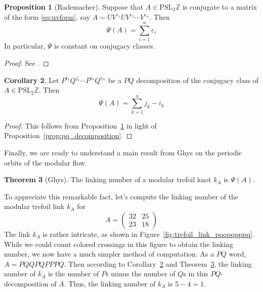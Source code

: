 \documentclass[12pt,twoside]{reedthesis}
\theoremstyle{definition}
\newtheorem{thm}{Theorem}[chapter]
\newtheorem{cor}[thm]{Corollary}
\newtheorem{prop}[thm]{Proposition}
\newcommand{\Z}{\mathbb{Z}}
\newcommand{\PSLZ}{\mathrm{PSL}_2{\Z}}
\begin{document}
\begin{prop}[Rademacher]\label{prop:rademacher_class_sum}
  Suppose that $A \in \PSLZ$ is conjugate to a matrix of the form \eqref{eq:uvform}, say $A \sim U V^{\varepsilon_1} U V^{\varepsilon_2} \cdots V^{\varepsilon_{n}}$.
  Then
  \begin{equation*}
    \Psi(A) = \sum_{i=1}^n \varepsilon_i
  \end{equation*}
  In particular, $\Psi$ is constant on conjugacy classes.
\end{prop}

\begin{proof}
  See \cite[58-60]{rademacher1972}.
\end{proof}

\begin{cor}\label{cor:rademacher_class_function_pq}
  Let $P^{i_1} Q^{j_1} \cdots P^{i_n} Q^{i_m}$ be a $PQ$ decomposition of the conjugacy class of $A \in \PSLZ$.
  Then
  \begin{equation*}
    \Psi(A) = \sum_{k=1}^n j_k - i_k
  \end{equation*}
\end{cor}

\begin{proof}
  This follows from Proposition~\ref{prop:rademacher_class_sum} in light of Proposition~\ref{prop:pq_decomposition}.
\end{proof}

Finally, we are ready to understand a main result from Ghys on the periodic orbits of the modular flow.

\begin{thm}[Ghys]\label{thm:ghys}
  The linking number of a modular trefoil knot $k_A$ is $\Psi(A)$.
\end{thm}

To appreciate this remarkable fact, let's compute the linking number of the modular trefoil link $k_A$ for
\begin{equation*}
  A = \begin{pmatrix}
    32 & 25 \\ 
    23 & 18
  \end{pmatrix}
\end{equation*}
The link $k_A$ is rather intricate, as shown in Figure~\ref{fig:trefoil_link_pqqpqpppq}.
While we could count colored crossings in this figure to obtain the linking number, we now have a much simpler method of computation.
As a $PQ$ word, $A = PQQPQPPPQ$.
Then according to Corollary~\ref{cor:rademacher_class_function_pq} and Theorem~\ref{thm:ghys}, the linking number of $k_A$ is the number of $P$s minus the number of $Q$s in this $PQ$-decomposition of $A$. 
Thus, the linking number of $k_A$ is $5 - 4 = 1$.
\end{document}
